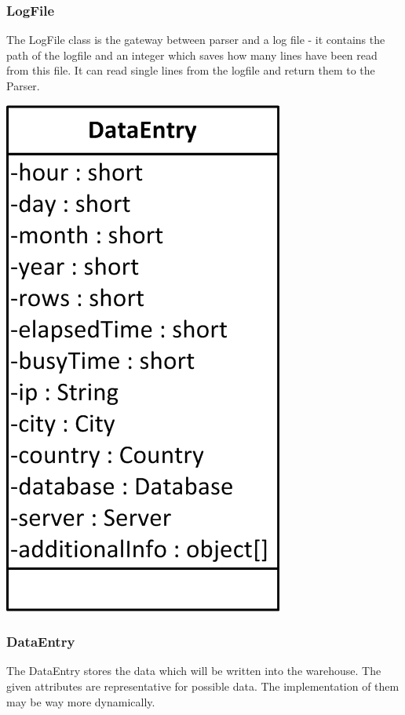\subsubsection*{LogFile}
The LogFile class is the gateway between parser and a log file - it contains the path of the logfile and an integer 
which saves how many lines have been read from this file. It can read single lines from the
logfile and return them to the Parser.

\begin{center}
\includegraphics{Pictures/Parts/DataEntry.png}
\end{center}  

\subsubsection*{DataEntry}
The DataEntry stores the data which will be written into the warehouse. The given attributes are representative
for possible data. The implementation of them may be way more dynamically.

